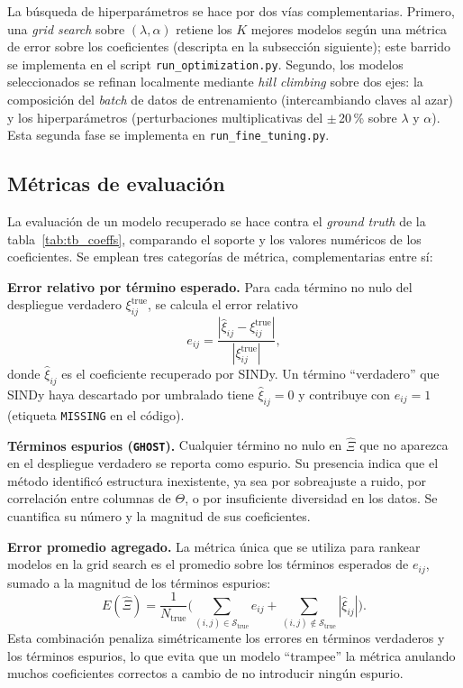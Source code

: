 La búsqueda de hiperparámetros se hace por dos vías complementarias. Primero, una \textit{grid search} sobre $(\lambda, \alpha)$ retiene los $K$ mejores modelos según una métrica de error sobre los coeficientes (descripta en la subsección siguiente); este barrido se implementa en el script \texttt{run\_optimization.py}. Segundo, los modelos seleccionados se refinan localmente mediante \textit{hill climbing} sobre dos ejes: la composición del \textit{batch} de datos de entrenamiento (intercambiando claves al azar) y los hiperparámetros (perturbaciones multiplicativas del $\pm$\,20\,\% sobre $\lambda$ y $\alpha$). Esta segunda fase se implementa en \texttt{run\_fine\_tuning.py}.

\subsection{Métricas de evaluación}

La evaluación de un modelo recuperado se hace contra el \textit{ground truth} de la tabla~\ref{tab:tb_coeffs}, comparando el soporte y los valores numéricos de los coeficientes. Se emplean tres categorías de métrica, complementarias entre sí:

\textbf{Error relativo por término esperado.} Para cada término no nulo del despliegue verdadero $\xi^{\text{true}}_{ij}$, se calcula el error relativo
\[
e_{ij} = \frac{|\hat{\xi}_{ij} - \xi^{\text{true}}_{ij}|}{|\xi^{\text{true}}_{ij}|},
\]
donde $\hat{\xi}_{ij}$ es el coeficiente recuperado por SINDy. Un término \enquote{verdadero} que SINDy haya descartado por umbralado tiene $\hat{\xi}_{ij} = 0$ y contribuye con $e_{ij} = 1$ (etiqueta \texttt{MISSING} en el código).

\textbf{Términos espurios (\texttt{GHOST}).} Cualquier término no nulo en $\hat{\Xi}$ que no aparezca en el despliegue verdadero se reporta como espurio. Su presencia indica que el método identificó estructura inexistente, ya sea por sobreajuste a ruido, por correlación entre columnas de $\Theta$, o por insuficiente diversidad en los datos. Se cuantifica su número y la magnitud de sus coeficientes.

\textbf{Error promedio agregado.} La métrica única que se utiliza para rankear modelos en la grid search es el promedio sobre los términos esperados de $e_{ij}$, sumado a la magnitud de los términos espurios:
\[
E(\hat{\Xi}) = \frac{1}{N_{\text{true}}}\Bigg(\sum_{(i,j) \in \mathcal{S}_{\text{true}}} e_{ij} + \sum_{(i,j) \notin \mathcal{S}_{\text{true}}} |\hat{\xi}_{ij}|\Bigg).
\]
Esta combinación penaliza simétricamente los errores en términos verdaderos y los términos espurios, lo que evita que un modelo \enquote{trampee} la métrica anulando muchos coeficientes correctos a cambio de no introducir ningún espurio.

